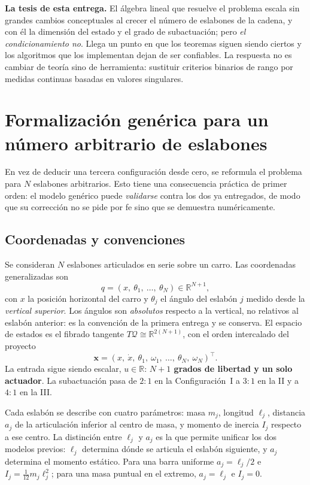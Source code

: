\documentclass[11pt,letterpaper]{article}
\theoremstyle{definition}
\theoremstyle{plain}
\theoremstyle{remark}
\newcommand{\R}{\mathbb{R}}
\newcommand{\xv}{\bm{x}}
\begin{document}
\begin{clave}
\small
\textbf{La tesis de esta entrega.} El álgebra lineal que resuelve el problema
escala sin grandes cambios conceptuales al crecer el número de eslabones de la
cadena, y con él la dimensión del estado y el grado de subactuación; pero
\emph{el condicionamiento no}. Llega un punto en que los teoremas siguen
siendo ciertos y los algoritmos que los implementan dejan de ser confiables. La
respuesta no es cambiar de teoría sino de herramienta: sustituir criterios
binarios de rango por medidas continuas basadas en valores singulares.
\end{clave}

\section{Formalización genérica para un número arbitrario de eslabones}
\label{sec:generico}

En vez de deducir una tercera configuración desde cero, se reformula el problema
para $N$ eslabones arbitrarios. Esto tiene una consecuencia práctica de primer
orden: el modelo genérico puede \emph{validarse} contra los dos ya entregados, de
modo que su corrección no se pide por fe sino que se demuestra numéricamente.

\subsection{Coordenadas y convenciones}

Se consideran $N$ eslabones articulados en serie sobre un carro. Las coordenadas
generalizadas son
\[
q=(x,\ \theta_1,\ \dots,\ \theta_N)\in\R^{N+1},
\]
con $x$ la posición horizontal del carro y $\theta_j$ el ángulo del eslabón $j$
medido desde la \emph{vertical superior}. Los ángulos son \emph{absolutos}
respecto a la vertical, no relativos al eslabón anterior: es la convención de la
primera entrega y se conserva. El espacio de estados es el fibrado tangente
$T\mathcal{Q}\cong\R^{2(N+1)}$, con el orden intercalado del proyecto
\[
\xv=(x,\ \dot x,\ \theta_1,\ \omega_1,\ \dots,\ \theta_N,\ \omega_N)^{\!\top}.
\]
La entrada sigue siendo escalar, $u\in\R$: \textbf{$N+1$ grados de libertad y un
solo actuador}. La subactuación pasa de $2\!:\!1$ en la Configuración~I a
$3\!:\!1$ en la II y a $4\!:\!1$ en la III.

Cada eslabón se describe con cuatro parámetros: masa $m_j$, longitud $\ell_j$,
distancia $a_j$ de la articulación inferior al centro de masa, y momento de
inercia $I_j$ respecto a ese centro. La distinción entre $\ell_j$ y $a_j$ es la
que permite unificar los dos modelos previos: $\ell_j$ determina dónde se
articula el eslabón siguiente, y $a_j$ determina el momento estático. Para una
barra uniforme $a_j=\ell_j/2$ e $I_j=\tfrac{1}{12}m_j\ell_j^2$; para una masa
puntual en el extremo, $a_j=\ell_j$ e $I_j=0$.
\end{document}
